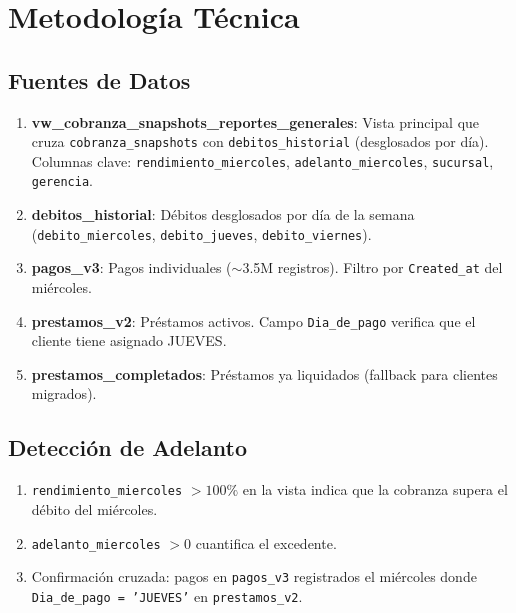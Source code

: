 \documentclass[11pt,a4paper]{article}
\begin{document}
\newpage

\section{Metodolog\'ia T\'ecnica}

\subsection{Fuentes de Datos}

\begin{enumerate}[leftmargin=2em]
  \item \textbf{vw\_cobranza\_snapshots\_reportes\_generales}: Vista principal que cruza
    \texttt{cobranza\_snapshots} con \texttt{debitos\_historial} (desglosados por d\'ia).
    Columnas clave: \texttt{rendimiento\_miercoles}, \texttt{adelanto\_miercoles},
    \texttt{sucursal}, \texttt{gerencia}.
  \item \textbf{debitos\_historial}: D\'ebitos desglosados por d\'ia de la semana
    (\texttt{debito\_miercoles}, \texttt{debito\_jueves}, \texttt{debito\_viernes}).
  \item \textbf{pagos\_v3}: Pagos individuales ($\sim$3.5M registros). Filtro por
    \texttt{Created\_at} del mi\'ercoles.
  \item \textbf{prestamos\_v2}: Pr\'estamos activos. Campo \texttt{Dia\_de\_pago}
    verifica que el cliente tiene asignado JUEVES.
  \item \textbf{prestamos\_completados}: Pr\'estamos ya liquidados (fallback para
    clientes migrados).
\end{enumerate}

\subsection{Detecci\'on de Adelanto}

\begin{enumerate}[leftmargin=2em]
  \item \texttt{rendimiento\_miercoles} $> 100\%$ en la vista indica que la cobranza
    supera el d\'ebito del mi\'ercoles.
  \item \texttt{adelanto\_miercoles} $> 0$ cuantifica el excedente.
  \item Confirmaci\'on cruzada: pagos en \texttt{pagos\_v3} registrados el mi\'ercoles
    donde \texttt{Dia\_de\_pago = 'JUEVES'} en \texttt{prestamos\_v2}.
\end{enumerate}
\end{document}
